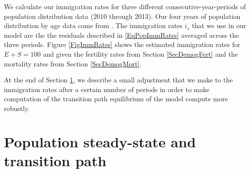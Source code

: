   We calculate our immigration rates for three different consecutive-year-periods of population distribution data (2010 through 2013). Our four years of population distribution by age data come from \citet{Census:2015}. The immigration rates $i_s$ that we use in our model are the the residuals described in \eqref{EqPopImmRates} averaged across the three periods. Figure \ref{FigImmRates} shows the estimated immigration rates for $E+S=100$ and given the fertility rates from Section \ref{SecDemogFert} and the mortality rates from Section \ref{SecDemogMort}.

  At the end of Section \ref{SecDemogPopSSTP}, we describe a small adjustment that we make to the immigration rates after a certain number of periods in order to make computation of the transition path equilibrium of the model compute more robustly.


\section{Population steady-state and transition path}\label{SecDemogPopSSTP}

